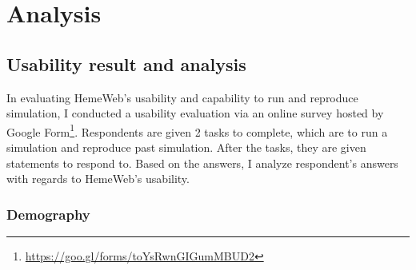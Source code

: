  

\chapter[Analysis]{Analysis}

\section{Usability result and analysis}

In evaluating HemeWeb's usability and capability to run and reproduce simulation, I conducted a usability evaluation via an online survey hosted by Google Form\footnote{\url{https://goo.gl/forms/toYsRwnGIGumMBUD2}}. Respondents are given 2 tasks to complete, which are to run a simulation and reproduce past simulation. After the tasks, they are given statements to respond to. Based on the answers, I analyze respondent's answers with regards to HemeWeb's usability.


\subsection{Demography}


\vspace{0.5cm}

\noindent%
\begin{minipage}{\linewidth}%
 \label{fig:survey-career}%
\end{minipage}

